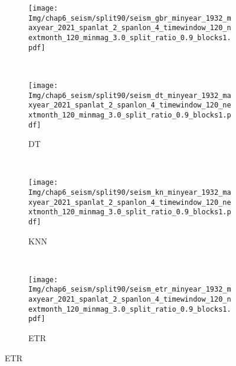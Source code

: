 \begin{figure}[!htbp]
\begin{subfigure}[b]{0.45\textwidth}
    \vspace{-0.2cm}
    \texttt{[image: Img/chap6\_seism/split90/seism\_gbr\_minyear\_1932\_maxyear\_2021\_spanlat\_2\_spanlon\_4\_timewindow\_120\_nextmonth\_120\_minmag\_3.0\_split\_ratio\_0.9\_blocks1.pdf]}
    \vspace{-1cm}
    \label{fig:seism_gbr_minyear_1932_maxyear_2021_spanlat_2_spanlon_4_timewindow_120_nextmonth_120_minmag_3.0_split_ratio_0.9_blocks1}
  \end{subfigure}
  ~
  \begin{subfigure}[b]{0.45\textwidth}
    \caption{DT}
    \vspace{-0.2cm}
    \texttt{[image: Img/chap6\_seism/split90/seism\_dt\_minyear\_1932\_maxyear\_2021\_spanlat\_2\_spanlon\_4\_timewindow\_120\_nextmonth\_120\_minmag\_3.0\_split\_ratio\_0.9\_blocks1.pdf]}
    \vspace{-1cm}
    \label{fig:seism_dt_minyear_1932_maxyear_2021_spanlat_2_spanlon_4_timewindow_120_nextmonth_120_minmag_3.0_split_ratio_0.9_blocks1}
  \end{subfigure}
  \\
  \begin{subfigure}[b]{0.45\textwidth}
    \caption{KNN}
    \vspace{-0.2cm}
    \texttt{[image: Img/chap6\_seism/split90/seism\_kn\_minyear\_1932\_maxyear\_2021\_spanlat\_2\_spanlon\_4\_timewindow\_120\_nextmonth\_120\_minmag\_3.0\_split\_ratio\_0.9\_blocks1.pdf]}
    \vspace{-1cm}
    \label{fig:seism_knn_minyear_1932_maxyear_2021_spanlat_2_spanlon_4_timewindow_120_nextmonth_120_minmag_3.0_split_ratio_0.9_blocks1}
  \end{subfigure}
  ~
  \begin{subfigure}[b]{0.45\textwidth}
    \caption{ETR}
    \vspace{-0.2cm}
    \texttt{[image: Img/chap6\_seism/split90/seism\_etr\_minyear\_1932\_maxyear\_2021\_spanlat\_2\_spanlon\_4\_timewindow\_120\_nextmonth\_120\_minmag\_3.0\_split\_ratio\_0.9\_blocks1.pdf]}
    \vspace{-1cm}
    \label{fig:seism_etr_minyear_1932_maxyear_2021_spanlat_2_spanlon_4_timewindow_120_nextmonth_120_minmag_3.0_split_ratio_0.9_blocks1}
  \end{subfigure}
  \label{fig:seism_minyear_1932_maxyear_2021_spanlat_2_spanlon_4_timewindow_120_nextmonth_120_minmag_3.0_split_ratio_0.90_blocks1}
\end{figure}

